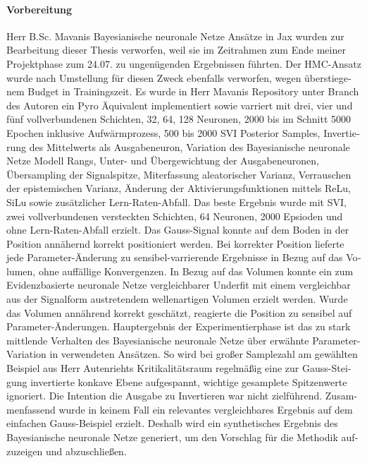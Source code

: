 \begin{otherlanguage}{ngerman}
\paragraph{Vorbereitung} Herr B.Sc. Mavanis \gls{Bayesianische neuronale Netze} Ansätze in Jax wurden zur Bearbeitung dieser Thesis verworfen, weil sie im Zeitrahmen zum Ende meiner Projektphase zum 24.07. zu ungenügenden Ergebnissen führten. Der HMC-Ansatz wurde nach Umstellung für diesen Zweck ebenfalls verworfen, wegen überstiegenem Budget in Trainingszeit. Es wurde in Herr Mavanis Repository unter Branch des Autoren ein Pyro Äquivalent implementiert sowie varriert mit drei, vier und fünf vollverbundenen Schichten, 32, 64, 128 Neuronen, 2000 bis im Schnitt 5000 Epochen inklusive Aufwärmprozess, 500 bis 2000 SVI Posterior Samples, Invertierung des Mittelwerts als Ausgabeneuron, Variation des \gls{Bayesianische neuronale Netze} Modell Rangs, Unter- und Übergewichtung der Ausgabeneuronen, Übersampling der Signalspitze, Miterfassung aleatorischer Varianz, Verrauschen der epistemischen Varianz, Änderung der Aktivierungsfunktionen mittels ReLu, SiLu sowie zusätzlicher Lern-Raten-Abfall. Das beste Ergebnis wurde mit SVI, zwei vollverbundenen versteckten Schichten, 64 Neuronen, 2000 Epsioden und ohne Lern-Raten-Abfall erzielt. Das Gauss-Signal konnte auf dem Boden in der Position annähernd korrekt positioniert werden. Bei korrekter Position lieferte jede Parameter-Änderung zu sensibel-varrierende Ergebnisse in Bezug auf das Volumen, ohne auffällige Konvergenzen. In Bezug auf das Volumen konnte ein zum \gls{Evidenzbasierte neuronale Netze} vergleichbarer Underfit mit einem vergleichbar aus der Signalform austretendem wellenartigen Volumen erzielt werden. Wurde das Volumen annährend korrekt geschätzt, reagierte die Position zu sensibel auf Parameter-Änderungen. Hauptergebnis der Experimentierphase ist das zu stark mittlende Verhalten des \gls{Bayesianische neuronale Netze} über erwähnte Parameter-Variation in verwendeten Ansätzen. So wird bei großer Samplezahl am gewählten Beispiel aus Herr Autenriehts Kritikalitätsraum regelmäßig eine zur Gauss-Steigung invertierte konkave Ebene aufgespannt, wichtige gesamplete Spitzenwerte ignoriert. Die Intention die Ausgabe zu Invertieren war nicht zielführend. Zusammenfassend wurde in keinem Fall ein relevantes vergleichbares Ergebnis auf dem einfachen Gauss-Beispiel erzielt. Deshalb wird ein synthetisches Ergebnis des \gls{Bayesianische neuronale Netze} generiert, um den Vorschlag für die Methodik aufzuzeigen und abzuschließen.  




\end{otherlanguage}
